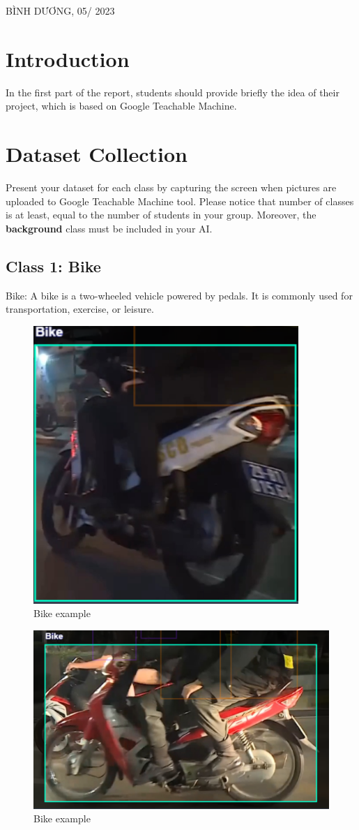 \documentclass[a4paper,11pt]{article}
\theoremstyle{mytheor}
\begin{document}
\begin{titlepage}
\begin{table}[h]
\begin{tabular}{rrl}
\end{tabular}
\end{table}
\vspace{3cm}
\begin{center}
{\footnotesize BÌNH DƯƠNG, 05/ 2023}
\end{center}
\end{titlepage}

\renewcommand{\contentsname}{Content}
\newpage
\vspace{1cm}
\tableofcontents
\newpage

\section{Introduction}
    

In the first part of the report, students should provide briefly the idea of their project, which is based on Google Teachable Machine.




\section{Dataset Collection}

Present your dataset for each class by capturing the screen when pictures are uploaded to Google Teachable Machine tool. Please notice that number of classes is at least, equal to the number of students in your group. Moreover, the \textbf{background} class must be included in your AI.\\

\subsection{Class 1: Bike}
Bike: A bike is a two-wheeled vehicle powered by pedals. It is commonly used for transportation, exercise, or leisure. 
\begin{figure}
    \centering
    \includegraphics[width=0.25\linewidth]{bike2.png}
    \caption{Bike example}
    \label{fig:enter-label}
\end{figure}
\begin{figure}
    \centering
    \includegraphics[width=0.25\linewidth]{images/Bike1.png}
    \caption{Bike example}
    \label{fig:enter-label}
\end{figure}
 
\end{document}
